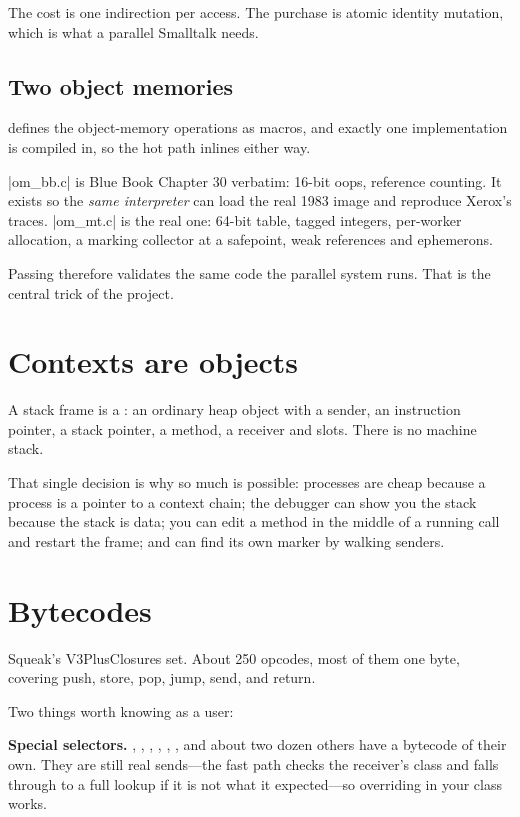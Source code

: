 The cost is one indirection per access. The purchase is atomic identity
mutation, which is what a parallel Smalltalk needs.

\subsection{Two object memories}

 defines the object-memory operations as macros, and exactly
one implementation is compiled in, so the hot path inlines either way.

\ct|om_bb.c| is Blue Book Chapter 30 verbatim: 16-bit oops, reference
counting. It exists so the \emph{same interpreter} can load the real 1983
image and reproduce Xerox's traces. \ct|om_mt.c| is the real one: 64-bit
table, tagged integers, per-worker allocation, a marking collector at a
safepoint, weak references and ephemerons.

Passing  therefore validates the same code the parallel system
runs. That is the central trick of the project.

\section{Contexts are objects}

A stack frame is a : an ordinary heap object with a sender,
an instruction pointer, a stack pointer, a method, a receiver and slots. There
is no machine stack.

That single decision is why so much is possible: processes are cheap because a
process is a pointer to a context chain; the debugger can show you the stack
because the stack is data; you can edit a method in the middle of a running
call and restart the frame; and  can find its own marker by
walking senders.

\section{Bytecodes}

Squeak's V3PlusClosures set. About 250 opcodes, most of them one byte,
covering push, store, pop, jump, send, and return.

Two things worth knowing as a user:

\textbf{Special selectors.} \ct{+}, \ct{-}, \ct{<}, \ct{=}, ,
,  and about two dozen others have a bytecode of their own.
They are still real sends---the fast path checks the receiver's class and
falls through to a full lookup if it is not what it expected---so overriding
\ct{+} in your class works.

